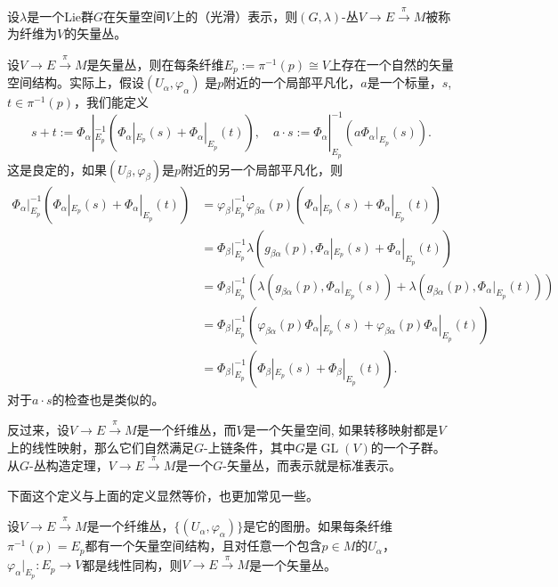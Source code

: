 \begin{para}[矢量丛]
	设$\lambda$是一个Lie群$G$在矢量空间$V$上的（光滑）表示，则$(G,\lambda)$-丛$V\to E\xrightarrow{\pi} M$被称为纤维为$V$的矢量丛。

	设$V\to E\xrightarrow{\pi} M$是矢量丛，则在每条纤维$E_p:=\pi^{-1}(p)\cong V$上存在一个自然的矢量空间结构。实际上，假设$(U_\alpha,\varphi_\alpha)$ 是$p$附近的一个局部平凡化，$a$是一个标量，$s$, $t\in \pi^{-1}(p)$，我们能定义
	\[
	s+t:=\Phi_{\alpha}|_{E_p}^{-1}\left(\Phi_{\alpha}|_{E_p}(s)+\Phi_{\alpha}|_{E_p}(t)\right),\quad a\cdot s:=\Phi_{\alpha}|_{E_p}^{-1}\left(a\Phi_{\alpha}|_{E_p}(s)\right).
	\]
	这是良定的，如果$(U_\beta,\varphi_\beta)$是$p$附近的另一个局部平凡化，则
	\[
	\begin{aligned}
	\Phi_{\alpha}|_{E_p}^{-1}\left(\Phi_{\alpha}|_{E_p}(s)+\Phi_{\alpha}|_{E_p}(t)\right)&=\varphi_\beta|_{E_p}^{-1}\varphi_{\beta\alpha}(p)\left(\Phi_{\alpha}|_{E_p}(s)+\Phi_{\alpha}|_{E_p}(t)\right)\\
	&=\Phi_\beta|_{E_p}^{-1}\lambda\left(g_{\beta\alpha}(p),\Phi_{\alpha}|_{E_p}(s)+\Phi_{\alpha}|_{E_p}(t)\right)\\
	&=\Phi_\beta|_{E_p}^{-1}\left(\lambda\left(g_{\beta\alpha}(p),\Phi_{\alpha}|_{E_p}(s)\right)+\lambda\left(g_{\beta\alpha}(p),\Phi_{\alpha}|_{E_p}(t)\right)\right)\\
	&=\Phi_\beta|_{E_p}^{-1}\left(\varphi_{\beta\alpha}(p)\Phi_{\alpha}|_{E_p}(s)+\varphi_{\beta\alpha}(p)\Phi_{\alpha}|_{E_p}(t)\right)\\
	&=\Phi_\beta|_{E_p}^{-1}\left(\Phi_{\beta}|_{E_p}(s)+\Phi_{\beta}|_{E_p}(t)\right).
	\end{aligned}
	\]
	对于$a\cdot s$的检查也是类似的。

	反过来，设$V\to E\xrightarrow{\pi} M$是一个纤维丛，而$V$是一个矢量空间, 如果转移映射都是$V$上的线性映射，那么它们自然满足$G$-上链条件，其中$G$是$\operatorname{GL}(V)$的一个子群。从$G$-丛构造定理，$V\to E\xrightarrow{\pi} M$是一个$G$-矢量丛，而表示就是标准表示。
\end{para}

下面这个定义与上面的定义显然等价，也更加常见一些。

\begin{pro}
设$V\to E\xrightarrow{\pi} M$是一个纤维丛，$\{(U_\alpha,\varphi_\alpha)\}$是它的图册。如果每条纤维$\pi^{-1}(p)=E_p$都有一个矢量空间结构，且对任意一个包含$p\in M$的$U_\alpha$，$\varphi_{\alpha}|_{E_p}:E_p\to V$都是线性同构，则$V\to E\xrightarrow{\pi} M$是一个矢量丛。
\end{pro}

